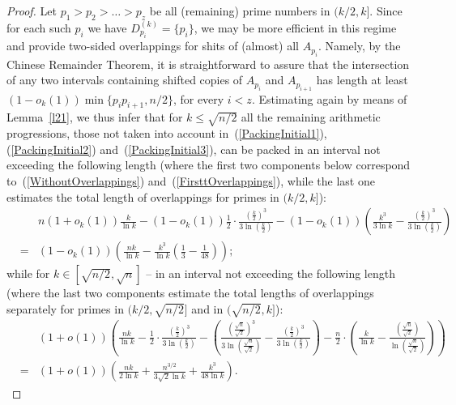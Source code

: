 \documentclass[12pt]{amsart}
\theoremstyle{plain}
\numberwithin{equation}{section}
\begin{document}
\begin{proof}
		Let $p_1>p_2>\ldots>p_z$ be all (remaining) prime numbers in $(k/2,k]$. Since for each such $p_i$ 
		we  have $D_{p_i}^{(k)}=\{p_i\}$, we may be more efficient in this regime and provide two-sided overlappings for shits of (almost) all $A_{p_i}$. Namely, by the Chinese Remainder Theorem, it is straightforward to 
		 assure that the intersection of any two intervals containing shifted copies of $A_{p_i}$ and $A_{p_{i+1}}$ has length at least $(1-o_k(1))\min\{p_ip_{i+1},n/2\}$, for every $i<z$.
		 Estimating again by means of  Lemma~\ref{l21}, we thus infer that for $k\leqslant \sqrt{n/2}$
		  all the remaining arithmetic progressions, those not taken into account in~(\ref{PackingInitial1}), (\ref{PackingInitial2}) and~(\ref{PackingInitial3}),  can be packed in an interval not exceeding the following length (where the first two components below correspond to~(\ref{WithoutOverlappings}) and~(\ref{FirsttOverlappings}), while the last one estimates the total length of overlappings for primes in $(k/2,k]$):		
		\begin{eqnarray}
			&&n(1+o_k(1))\frac{k}{\ln k}
			-(1-o_k(1))\frac{1}{2}\cdot \frac{\left(\frac{k}{2}\right)^3}{3\ln \left(\frac{k}{2}\right)} 
			-(1-o_k(1))\left(\frac{k^3}{3\ln k} - \frac{\left(\frac{k}{2}\right)^3}{3\ln \left(\frac{k}{2}\right)} \right) \nonumber\\
			&=& (1-o_k(1))\left(\frac{nk}{\ln k} - \frac{k^3}{\ln k} \left(\frac{1}{3}-\frac{1}{48}\right)\right); \nonumber
		\end{eqnarray}
		while for  $k\in [\sqrt{n/2}, \sqrt{n}]$ -- in an interval 
		not exceeding the following length (where the last two components
		estimate the total lengths of overlappings separately for primes in $(k/2,\sqrt{n/2}]$ and in $(\sqrt{n/2},k]$):
		\begin{eqnarray}
					&&(1+o(1))\left(\frac{nk}{\ln k}
			-\frac{1}{2}\cdot \frac{\left(\frac{k}{2}\right)^3}{3\ln \left(\frac{k}{2}\right)} 
			-\left(\frac{\left(\frac{\sqrt{n}}{\sqrt{2}}\right)^3}{3\ln \left(\frac{\sqrt{n}}{\sqrt{2}}\right)} - \frac{\left(\frac{k}{2}\right)^3}{3\ln \left(\frac{k}{2}\right)} \right) 
			-\frac{n}{2}\cdot\left(\frac{k}{\ln k}-\frac{\left(\frac{\sqrt{n}}{\sqrt{2}}\right)}{\ln \left(\frac{\sqrt{n}}{\sqrt{2}}\right)}\right)\right)\nonumber\\
			&=& (1+o(1))\left(\frac{nk}{2\ln k} + \frac{n^{3/2}}{3\sqrt{2}\ln k} +\frac{k^3}{48\ln k}\right). \nonumber
		\end{eqnarray}
	\end{proof}
	
\end{document}
